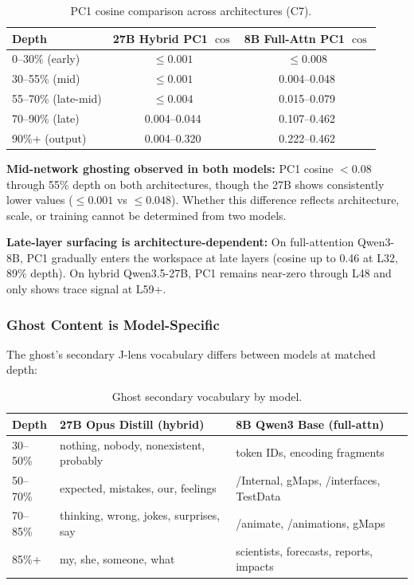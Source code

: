\documentclass[11pt,a4paper]{article}
\begin{document}
\begin{table}[H]
\centering
\caption{PC1 cosine comparison across architectures (C7).}
\label{tab:arch-compare}
\begin{tabular}{lcc}
\toprule
Depth & 27B Hybrid PC1 $\cos$ & 8B Full-Attn PC1 $\cos$ \\
\midrule
0--30\% (early)     & $\leq 0.001$ & $\leq 0.008$ \\
30--55\% (mid)      & $\leq 0.001$ & 0.004--0.048 \\
55--70\% (late-mid) & $\leq 0.004$ & 0.015--0.079 \\
70--90\% (late)     & 0.004--0.044 & 0.107--0.462 \\
90\%+ (output)      & 0.004--0.320 & 0.222--0.462 \\
\bottomrule
\end{tabular}
\end{table}

\textbf{Mid-network ghosting observed in both models:} PC1 cosine $< 0.08$ through 55\% depth on both architectures, though the 27B shows consistently lower values ($\leq 0.001$ vs $\leq 0.048$). Whether this difference reflects architecture, scale, or training cannot be determined from two models.

\textbf{Late-layer surfacing is architecture-dependent:} On full-attention Qwen3-8B, PC1 gradually enters the workspace at late layers (cosine up to 0.46 at L32, 89\% depth). On hybrid Qwen3.5-27B, PC1 remains near-zero through L48 and only shows trace signal at L59+.

\subsubsection{Ghost Content is Model-Specific}

The ghost's secondary J-lens vocabulary differs between models at matched depth:

\begin{table}[H]
\centering
\caption{Ghost secondary vocabulary by model.}
\label{tab:ghost-content}
\small
\begin{tabular}{lp{5cm}p{5cm}}
\toprule
Depth & 27B Opus Distill (hybrid) & 8B Qwen3 Base (full-attn) \\
\midrule
30--50\% & nothing, nobody, nonexistent, probably & token IDs, encoding fragments \\
50--70\% & expected, mistakes, our, feelings & /Internal, gMaps, /interfaces, TestData \\
70--85\% & thinking, wrong, jokes, surprises, say & /animate, /animations, gMaps \\
85\%+ & my, she, someone, what & scientists, forecasts, reports, impacts \\
\bottomrule
\end{tabular}
\end{table}
\end{document}
